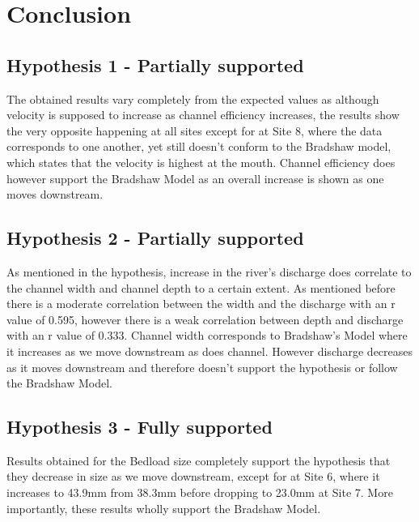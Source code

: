 \section{Conclusion}

\subsection{Hypothesis 1 - Partially supported}

The obtained results vary completely from the expected values as although velocity is supposed to increase as channel efficiency increases, the results show the very opposite happening at all sites except for at Site 8, where the data corresponds to one another, yet still doesn't conform to the Bradshaw model, which states that the velocity is highest at the mouth. Channel efficiency does however support the Bradshaw Model as an overall increase is shown as one moves downstream.



\subsection{Hypothesis 2 - Partially supported}

As mentioned in the hypothesis, increase in the river's discharge does correlate to the channel width and channel depth to a certain extent. As mentioned before there is a moderate correlation between the width and the discharge with an r value of 0.595, however there is a weak correlation between depth and discharge with an r value of 0.333. Channel width corresponds to Bradshaw's Model where it increases as we move downstream as does channel. However discharge decreases as it moves downstream and therefore doesn't support the hypothesis or follow the Bradshaw Model.




\subsection{Hypothesis 3 - Fully supported}

Results obtained for the Bedload size completely support the hypothesis that they decrease in size as we move downstream, except for at Site 6, where it increases to 43.9mm from 38.3mm before dropping to 23.0mm at Site 7. More importantly, these results wholly support the Bradshaw Model.